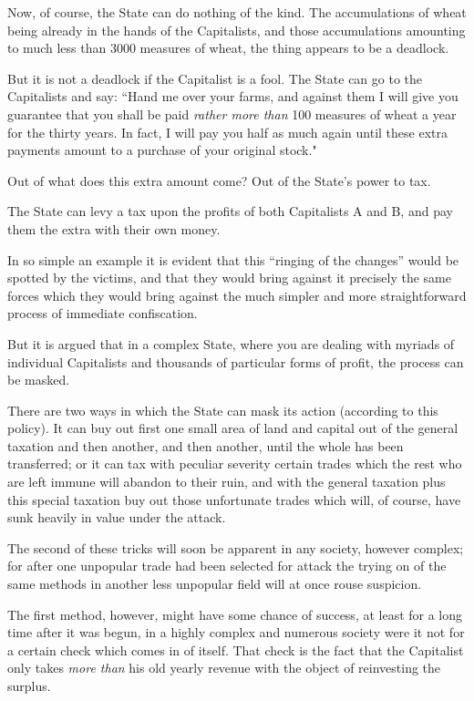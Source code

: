 \documentclass{book}
\begin{document}
Now, of course, the State can do nothing of the kind. The accumulations of wheat being already in the hands of the Capitalists, and those accumulations amounting to much less than 3000 measures of wheat, the thing appears to be a deadlock.

But it is not a deadlock if the Capitalist is a fool. The State can go to the Capitalists and say: “Hand me over your farms, and against them I will give you guarantee that you shall be paid \emph{rather more than} 100 measures of wheat a year for the thirty years. In fact, I will pay you half as much again until these extra payments amount to a purchase of your original stock."

Out of what does this extra amount come? Out of the State’s power to tax.

The State can levy a tax upon the profits of both Capitalists A and B, and pay them the extra with their own money.

In so simple an example it is evident that this “ringing of the changes” would be spotted by the victims, and that they would bring against it precisely the same forces which they would bring against the much simpler and more straightforward process of immediate confiscation.

But it is argued that in a complex State, where you are dealing with myriads of individual Capitalists and thousands of particular forms of profit, the process can be masked.

There are two ways in which the State can mask its action (according to this policy). It can buy out first one small area of land and capital out of the general taxation and then another, and then another, until the whole has been transferred; or it can tax with peculiar severity certain trades which the rest who are left immune will abandon to their ruin, and with the general taxation plus this special taxation buy out those unfortunate trades which will, of course, have sunk heavily in value under the attack.

The second of these tricks will soon be apparent in any society, however complex; for after one unpopular trade had been selected for attack the trying on of the same methods in another less unpopular field will at once rouse suspicion.\footnotemark[2]

The first method, however, might have some chance of success, at least for a long time after it was begun, in a highly complex and numerous society were it not for a certain check which comes in of itself. That check is the fact that the Capitalist only takes \emph{more than} his old yearly revenue with the object of reinvesting the surplus.
\end{document}

